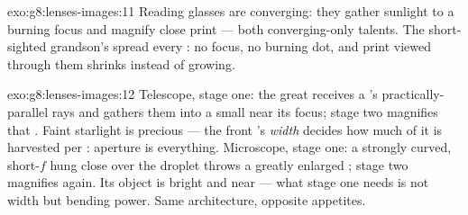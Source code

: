 \begin{solution}{exo:g8:lenses-images:11}
Reading glasses are converging: they gather sunlight to a
burning focus and magnify close print --- both converging-only
talents. The short-sighted grandson's  spread
every : no focus, no burning dot, and print viewed through
them shrinks instead of growing.
\end{solution}

\begin{solution}{exo:g8:lenses-images:12}
Telescope, stage one: the great  receives a 's
practically-parallel rays and gathers them into a small  near its focus; stage two magnifies that . Faint
starlight is precious --- the front 's \emph{width}
decides how much of it is harvested per : aperture is
everything. Microscope, stage one: a strongly curved,
short-$f$  hung close over the droplet throws a greatly
enlarged ; stage two magnifies again. Its object is
bright and near --- what stage one needs is not width but
bending power. Same architecture, opposite appetites.
\end{solution}


